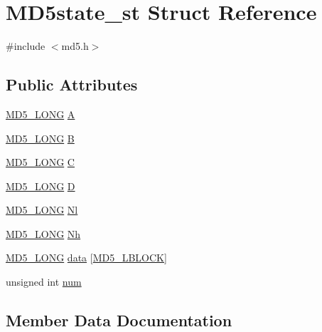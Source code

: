 \hypertarget{struct_m_d5state__st}{}\section{M\+D5state\+\_\+st Struct Reference}
\label{struct_m_d5state__st}


{\ttfamily \#include $<$md5.\+h$>$}

\subsection*{Public Attributes}
\begin{DoxyCompactItemize}
\item 
\hyperlink{md5_8h_a9823dc2539b5bd2e5dfc531d5b1c64db}{M\+D5\+\_\+\+L\+O\+NG} \hyperlink{struct_m_d5state__st_ac01316cea74aeb98bb8d557f57c85a08}{A}
\item 
\hyperlink{md5_8h_a9823dc2539b5bd2e5dfc531d5b1c64db}{M\+D5\+\_\+\+L\+O\+NG} \hyperlink{struct_m_d5state__st_a0a0927f6cc209cb0d4565a89af43e59c}{B}
\item 
\hyperlink{md5_8h_a9823dc2539b5bd2e5dfc531d5b1c64db}{M\+D5\+\_\+\+L\+O\+NG} \hyperlink{struct_m_d5state__st_a90da41912fea04ac78eb4c580744e79b}{C}
\item 
\hyperlink{md5_8h_a9823dc2539b5bd2e5dfc531d5b1c64db}{M\+D5\+\_\+\+L\+O\+NG} \hyperlink{struct_m_d5state__st_a1bd5cc2fd46230a9b3ca542ce941447e}{D}
\item 
\hyperlink{md5_8h_a9823dc2539b5bd2e5dfc531d5b1c64db}{M\+D5\+\_\+\+L\+O\+NG} \hyperlink{struct_m_d5state__st_accb86d088daeafde5a370fb8a2961bd7}{Nl}
\item 
\hyperlink{md5_8h_a9823dc2539b5bd2e5dfc531d5b1c64db}{M\+D5\+\_\+\+L\+O\+NG} \hyperlink{struct_m_d5state__st_a2eb6f766a15bf4987f75eda8f954e1f2}{Nh}
\item 
\hyperlink{md5_8h_a9823dc2539b5bd2e5dfc531d5b1c64db}{M\+D5\+\_\+\+L\+O\+NG} \hyperlink{struct_m_d5state__st_a00b0904b7f53a7a3fc899f56af14d207}{data} \mbox{[}\hyperlink{md5_8h_a8ddf53027505210f2be7d42e9069ce2e}{M\+D5\+\_\+\+L\+B\+L\+O\+CK}\mbox{]}
\item 
unsigned int \hyperlink{struct_m_d5state__st_ae35c099cfb7bdf972b4419998c7efc92}{num}
\end{DoxyCompactItemize}


\subsection{Member Data Documentation}
